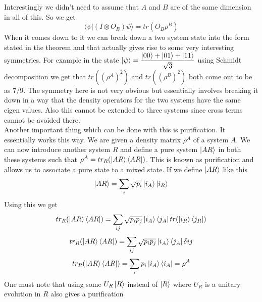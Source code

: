 \documentclass{report}
\begin{document}
Interestingly we didn't need to assume that $A$ and $B$ are of the same dimension in all of this. So we get
\begin{equation}\langle\psi|(I \otimes O_B)\psi\rangle = tr({O_{B}}\rho^B)
\end{equation}
When it comes down to it we can break down a two system state into the form stated in the theorem and that actually gives rise to some very interesting symmetries. For example in the state $\ket{\psi} = \dfrac{\ket{00} + \ket{01} + \ket{11}}{\sqrt{3}}$ using Schmidt decomposition we get that $tr((\rho^A)^2)$ and $tr((\rho^B)^2)$ both come out to be as $7/9$. The symmetry here is not very obvious but essentially involves breaking it down in a way that the density operators for the two systems have the same eigen values.
Also this cannot be extended to three systems since cross terms cannot be avoided there.\\
Another important thing which can be done with this is purification. It essentially works this way. We are given a density matrix $\rho^A$ of a system $A$. We can now introduce another system $R$ and define a pure system $\ket{AR}$ in both these systems such that $\rho^{A} = tr_{R}(\ket{AR}\bra{AR})$. This is known as purification and allows us to associate a pure state to a mixed state. If we define $\ket{AR}$ like this
$$\ket{AR} = \sum_{i}\sqrt{p_i}\ket{i_A}\ket{i_R}$$
Using this we get
\begin{equation}tr_{R}(\ket{AR}\bra{AR}) = \sum_{ij}\sqrt{p_{i}p_{j}}\ket{i_A}\bra{j_A}tr(\ket{i_R}\bra{j_R})\end{equation}
\begin{equation}tr_{R}(\ket{AR}\bra{AR}) = \sum_{ij}\sqrt{p_{i}p_{j}}\ket{i_A}\bra{j_A}\delta{ij}\end{equation}
\begin{equation}tr_{R}(\ket{AR}\bra{AR}) = \sum_{i}p_{i}\ket{i_A}\bra{i_A} = \rho^{A}\end{equation}
One must note that using some $U_{R}\ket{R}$ instead of $\ket{R}$ where $U_{R}$ is a unitary evolution in $R$ also gives a purification
\end{document}
